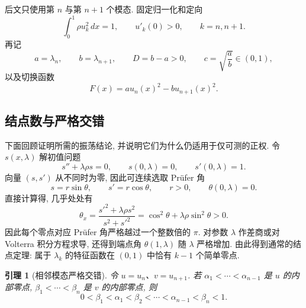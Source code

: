 \documentclass[UTF8]{ctexart}
\newtheorem{lemma}[theorem]{引理}
\begin{document}
后文只使用第 $n$ 与第 $n+1$ 个模态. 固定归一化和定向
\begin{equation}
	\int_0^1\rho u_k^2\,dx=1,\qquad u'_k(0)>0,\qquad k=n,n+1 .
	\label{eq:normalize}
\end{equation}
再记
\begin{equation}
	a=\lambda_n,\qquad b=\lambda_{n+1},\qquad D=b-a>0,\qquad
	c=\sqrt{\frac{a}{b}}\in(0,1),
	\label{eq:abc}
\end{equation}
以及切换函数
\begin{equation}
	F(x)=au_n(x)^2-bu_{n+1}(x)^2 .
	\label{eq:f}
\end{equation}

\subsection{结点数与严格交错}

下面回顾证明所需的振荡结论, 并说明它们为什么仍适用于仅可测的正权. 令 $s(x,\lambda)$ 解初值问题
\begin{equation*}
	s''+\lambda\rho s=0,\qquad s(0,\lambda)=0,\qquad s'(0,\lambda)=1 .
\end{equation*}
向量 $(s,s')$ 从不同时为零, 因此可连续选取 Pr\"ufer 角
\begin{equation*}
	s=r\sin\theta,\qquad s'=r\cos\theta,\qquad r>0,\qquad \theta(0,\lambda)=0 .
\end{equation*}
直接计算得, 几乎处处有
\begin{equation}
	\theta_x=\frac{s'^2+\lambda\rho s^2}{s^2+s'^2}
		=\cos^2\theta+\lambda\rho\sin^2\theta>0 .
	\label{eq:theta_x}
\end{equation}
因此每个零点对应 Pr\"ufer 角严格越过一个整数倍的 $\pi$. 对参数 $\lambda$ 作差商或对 Volterra
积分方程求导, 还得到端点角 $\theta(1,\lambda)$ 随 $\lambda$ 严格增加. 由此得到通常的结点定理:
属于 $\lambda_k$ 的特征函数在 $(0,1)$ 中恰有 $k-1$ 个简单零点.

\begin{lemma}[相邻模态严格交错]\label{lem:interlace}
令 $u=u_n$、$v=u_{n+1}$. 若 $\alpha_1<\cdots<\alpha_{n-1}$ 是 $u$ 的内部零点,
$\beta_1<\cdots<\beta_n$ 是 $v$ 的内部零点, 则
\begin{equation}
	0<\beta_1<\alpha_1<\beta_2<\cdots<\alpha_{n-1}<\beta_n<1 .
	\label{eq:interlace}
\end{equation}
\end{lemma}
\end{document}
